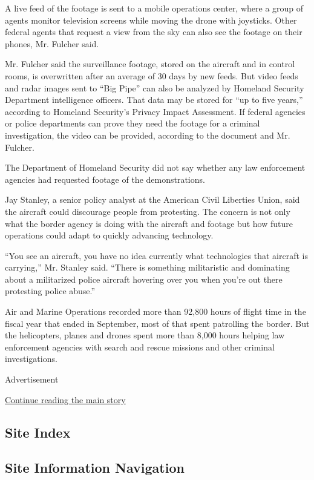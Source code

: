 A live feed of the footage is sent to a mobile operations center, where
a group of agents monitor television screens while moving the drone with
joysticks. Other federal agents that request a view from the sky can
also see the footage on their phones, Mr. Fulcher said.

Mr. Fulcher said the surveillance footage, stored on the aircraft and in
control rooms, is overwritten after an average of 30 days by new feeds.
But video feeds and radar images sent to ``Big Pipe'' can also be
analyzed by Homeland Security Department intelligence officers. That
data may be stored for ``up to five years,'' according to Homeland
Security's Privacy Impact Assessment. If federal agencies or police
departments can prove they need the footage for a criminal
investigation, the video can be provided, according to the document and
Mr. Fulcher.

The Department of Homeland Security did not say whether any law
enforcement agencies had requested footage of the demonstrations.

Jay Stanley, a senior policy analyst at the American Civil Liberties
Union, said the aircraft could discourage people from protesting. The
concern is not only what the border agency is doing with the aircraft
and footage but how future operations could adapt to quickly advancing
technology.

``You see an aircraft, you have no idea currently what technologies that
aircraft is carrying,'' Mr. Stanley said. ``There is something
militaristic and dominating about a militarized police aircraft hovering
over you when you're out there protesting police abuse.''

Air and Marine Operations recorded more than 92,800 hours of flight time
in the fiscal year that ended in September, most of that spent
patrolling the border. But the helicopters, planes and drones spent more
than 8,000 hours helping law enforcement agencies with search and rescue
missions and other criminal investigations.

Advertisement

\protect\hyperlink{after-bottom}{Continue reading the main story}

\hypertarget{site-index}{%
\subsection{Site Index}\label{site-index}}

\hypertarget{site-information-navigation}{%
\subsection{Site Information
Navigation}\label{site-information-navigation}}

